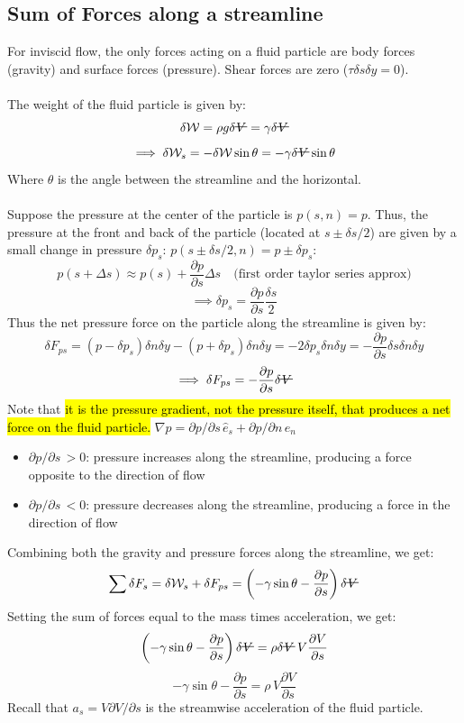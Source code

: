 ﻿\documentclass[12pt]{article}
\newcommand{\vol}{\mathord{\text{\ooalign{\hidewidth $V$\hidewidth\cr\kern-0.5pt\raisebox{0.8ex}{\rule[0pt]{1em}{0.5pt}}}}}}
\begin{document}
\subsection*{Sum of Forces along a streamline}
For inviscid flow, the only forces acting on a fluid particle are body forces (gravity) and surface forces (pressure). Shear forces are zero ($\tau \delta s\delta y = 0$).\\\\
The weight of the fluid particle is given by:
\[\delta \mathcal{W} = \rho g \delta \vol = \gamma \delta \vol\]
\[\implies \delta \mathcal{W}_s = -\delta \mathcal{W}\sin\theta = -\gamma \delta \vol \sin\theta\]
Where $\theta$ is the angle between the streamline and the horizontal.\\\\
Suppose the pressure at the center of the particle is $p(s,n)=p$. Thus, the pressure at the front and back of the particle (located at $s\pm \delta s/2$) are given by a small change in pressure $\delta p_s$: $p(s\pm \delta s/2, n) = p \pm \delta p_s$:
\[p(s + \Delta s) \approx p(s) + \frac{\partial p}{\partial s}\Delta s \quad \text{(first order taylor series approx)}\]
\[\implies \delta p_s = \frac{\partial p}{\partial s}\frac{\delta s}{2}\]
Thus the net pressure force on the particle along the streamline is given by:
\[\delta F_{ps} = (p - \delta p_s)\delta n \delta y - (p + \delta p_s)\delta n \delta y = -2\delta p_s \delta n \delta y=  - \frac{\partial p}{\partial s} \delta s \delta n \delta y \]
\[\implies \delta F_{ps} = -\frac{\partial p}{\partial s} \delta \vol\]
Note that \hl{it is the pressure gradient, not the pressure itself, that produces a net force on the fluid particle.} $\nabla p = \partial p/\partial s\,\hat{e}_s + \partial p/\partial n\,\hat{e}_n$
\begin{itemize}
    \item $\partial p/ \partial s\,> 0$: pressure increases along the streamline, producing a force opposite to the direction of flow
    \item $\partial p/ \partial s\,< 0$: pressure decreases along the streamline, producing a force in the direction of flow
\end{itemize}
Combining both the gravity and pressure forces along the streamline, we get:
\[\sum \delta F_s = \delta \mathcal{W}_s + \delta F_{ps} = \left(-\gamma \sin\theta - \frac{\partial p}{\partial s}\right)\delta \vol\]
Setting the sum of forces equal to the mass times acceleration, we get:
\[\left(-\gamma \sin\theta - \frac{\partial p}{\partial s}\right)\delta \vol = \rho \delta \vol\, V \frac{\partial V}{\partial s}\]
\[\boxed{-\gamma \sin\theta - \frac{\partial p}{\partial s}= \rho \, V \frac{\partial V}{\partial s}}\]
Recall that $a_s = V \partial V/\partial s$ is the streamwise acceleration of the fluid particle. 
\end{document}
